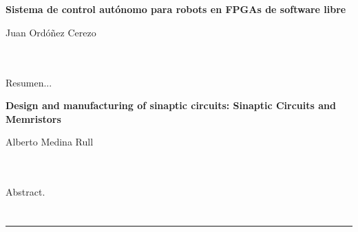 \chapter*{}






\cleardoublepage
\thispagestyle{empty}

\begin{center}
{\large\bfseries  Sistema de
	control autónomo para robots en FPGAs de
	software libre}\\
\end{center}
\begin{center}
Juan Ordóñez Cerezo\\
\end{center}

\\

\vspace{0.7cm}
\\

Resumen...
\cleardoublepage


\thispagestyle{empty}


\begin{center}
{\large\bfseries Design and manufacturing of sinaptic circuits: Sinaptic Circuits and Memristors}\\
\end{center}
\begin{center}
Alberto Medina Rull\\
\end{center}

\\

\vspace{0.7cm}
\\

Abstract.

\chapter*{}
\thispagestyle{empty}

\noindent\rule[-1ex]{\textwidth}{2pt}\\[4.5ex]

